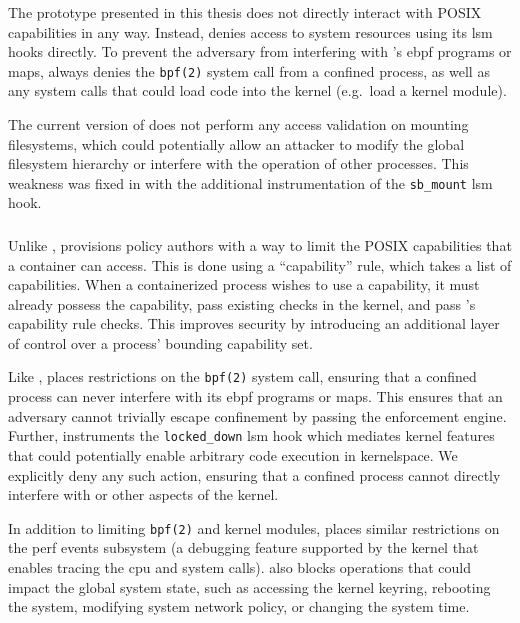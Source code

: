 \subsubsection{\bpfbox{}}

The \bpfbox{} prototype presented in this thesis does not directly interact with POSIX
capabilities in any way. Instead, \bpfbox{} denies access to system resources using its
\gls{lsm} hooks directly. To prevent the adversary from interfering with \bpfbox{}'s
\gls{ebpf} programs or maps, \bpfbox{} always denies the \texttt{bpf(2)} system call from
a confined process, as well as any system calls that could load code into the kernel
(e.g.\ load a kernel module).

The current version of \bpfbox{} does not perform any access validation on mounting
filesystems, which could potentially allow an attacker to modify the global filesystem
hierarchy or interfere with the operation of other processes. This weakness was fixed in
\bpfcontain{} with the additional instrumentation of the \texttt{sb\_mount} \gls{lsm}
hook.

\subsubsection{\bpfcontain{}}

Unlike \bpfbox{}, \bpfcontain{} provisions policy authors with a way to limit the POSIX
capabilities that a container can access. This is done using a \enquote{capability} rule,
which takes a list of capabilities. When a containerized process wishes to use
a capability, it must already possess the capability, pass existing checks in the kernel,
and pass \bpfcontain{}'s capability rule checks. This improves security by introducing an
additional layer of control over a process' bounding capability set.

Like \bpfbox{}, \bpfcontain{} places restrictions on the \texttt{bpf(2)} system call,
ensuring that a confined process can never interfere with its \gls{ebpf} programs or maps.
This ensures that an adversary cannot trivially escape confinement by passing the
enforcement engine. Further, \bpfcontain{} instruments the \texttt{locked\_down} \gls{lsm}
hook which mediates kernel features that could potentially enable arbitrary code execution
in kernelspace.  We explicitly deny any such action, ensuring that a confined process
cannot directly interfere with \bpfcontain{} or other aspects of the kernel.

In addition to limiting \texttt{bpf(2)} and kernel modules, \bpfcontain{} places similar
restrictions on the perf events subsystem (a debugging feature supported by the kernel
that enables tracing the \gls{cpu} and system calls). \bpfcontain{} also blocks operations
that could impact the global system state, such as accessing the kernel keyring, rebooting
the system, modifying system network policy, or changing the system time.

